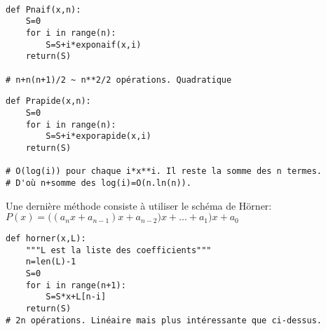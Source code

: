 \ifprof
\begin{corrige}
\begin{lstlisting}

def Pnaif(x,n):
    S=0
    for i in range(n):
        S=S+i*exponaif(x,i)
    return(S)

# n+n(n+1)/2 ~ n**2/2 opérations. Quadratique

\end{lstlisting}
\end{corrige}
\else
\fi

\ifprof
\begin{corrige}
\begin{lstlisting}
def Prapide(x,n):
    S=0
    for i in range(n):
        S=S+i*exporapide(x,i)
    return(S)

# O(log(i)) pour chaque i*x**i. Il reste la somme des n termes.
# D'où n+somme des log(i)=O(n.ln(n)).
\end{lstlisting}
\end{corrige}
\else
\fi
	
\ifprof
\else
 Une dernière méthode consiste à utiliser le schéma de Hörner: 	
 $P(x)= ({(a_nx+a_{n-1})x+a_{n-2})x+...+a_1)x+a_0}$
\fi

\ifprof
\begin{corrige}
\begin{lstlisting}
def horner(x,L):
    """L est la liste des coefficients"""
    n=len(L)-1
    S=0
    for i in range(n+1):
        S=S*x+L[n-i]
    return(S)
# 2n opérations. Linéaire mais plus intéressante que ci-dessus.
\end{lstlisting}
\end{corrige}
\else
\fi


